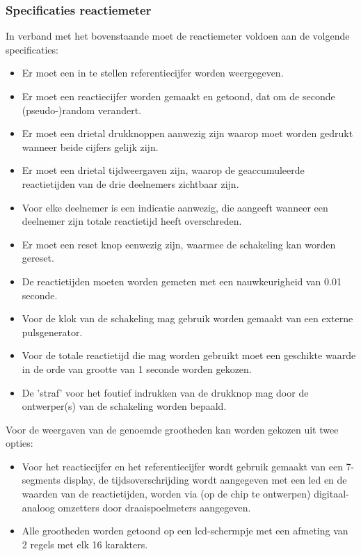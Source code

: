 \subsubsection{Specificaties reactiemeter}
In verband met het bovenstaande moet de reactiemeter voldoen aan de volgende
specificaties:
\begin{itemize}
\item Er moet een in te stellen referentiecijfer worden weergegeven.
\item Er moet een reactiecijfer worden gemaakt en getoond, dat om de
      seconde (pseudo-)random verandert.
\item Er moet een drietal drukknoppen aanwezig zijn waarop moet worden gedrukt
      wanneer beide cijfers gelijk zijn.
\item Er moet een drietal tijdweergaven zijn, waarop de geaccumuleerde
      reactietijden van de drie deelnemers zichtbaar zijn.
\item Voor elke deelnemer is een indicatie aanwezig, die aangeeft wanneer
      een deelnemer zijn totale reactietijd heeft overschreden.
\item Er moet een reset knop eenwezig zijn, waarmee de schakeling kan worden
      gereset.
\item De reactietijden moeten worden gemeten met een nauwkeurigheid
      van 0.01 seconde.
\item Voor de klok van de schakeling mag gebruik worden gemaakt van een
      externe pulsgenerator.
\item Voor de totale reactietijd die mag worden gebruikt moet een geschikte
      waarde in de orde van grootte van 1 seconde worden gekozen.
\item De 'straf' voor het foutief indrukken van de drukknop mag door de
      ontwerper(s) van de schakeling worden bepaald.
\end{itemize}
Voor de weergaven van de genoemde grootheden kan worden gekozen uit twee opties:
\begin{itemize}
\item Voor het reactiecijfer en het referentiecijfer wordt gebruik gemaakt
      van een 7-segments display, de tijdsoverschrijding wordt aangegeven
      met een led en de waarden van de reactietijden, worden via (op de chip
      te ontwerpen) digitaal-analoog omzetters door draaispoelmeters aangegeven.
\item Alle grootheden worden getoond op een lcd-schermpje met een afmeting
      van 2 regels met elk 16 karakters.
\end{itemize}

